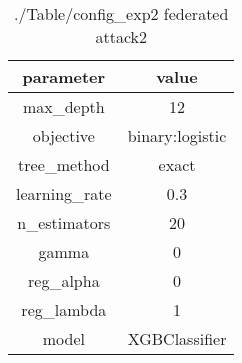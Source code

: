 \begin{table}[h]
\centering
\begin{tabular}{| c|c|}
\hline
parameter & value\\
\hline
max_depth & 12 \\\hline
objective & binary:logistic \\\hline
tree_method & exact \\\hline
learning_rate & 0.3 \\\hline
n_estimators & 20 \\\hline
gamma & 0 \\\hline
reg_alpha & 0 \\\hline
reg_lambda & 1 \\\hline
model & XGBClassifier \\\hline

\end{tabular}\caption{./Table/config_exp2 federated attack2}
\label{tab:./Table/config_exp2 federated attack2}
\end{table}
